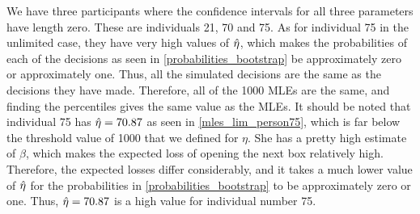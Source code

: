 We have three participants where the confidence intervals for all three parameters have length zero. These are individuals 21, 70 and 75. As for individual 75 in the unlimited case, they have very high values of $\hat{\eta}$, which makes the probabilities of each of the decisions as seen in \eqref{probabilities_bootstrap} be approximately zero or approximately one. Thus, all the simulated decisions are the same as the decisions they have made. Therefore, all of the 1000 MLEs are the same, and finding the percentiles gives the same value as the MLEs. It should be noted that individual 75 has $\hat{\eta}=70.87$ as seen in \eqref{mles_lim_person75}, which is far below the threshold value of 1000 that we defined for $\eta$. She has a pretty high estimate of $\beta$, which makes the expected loss of opening the next box relatively high. Therefore, the expected losses differ considerably, and it takes a much lower value of $\hat{\eta}$ for the probabilities in \eqref{probabilities_bootstrap} to be approximately zero or one. Thus, $\hat{\eta}=70.87$ is a high value for individual number 75.


